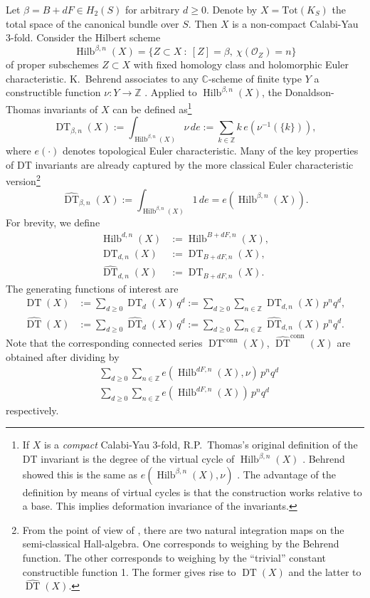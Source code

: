 \documentclass{amsart}
\theoremstyle{definition}
\newcommand{\CC} {\mathbb{C}}          %
\newcommand{\ZZ} {\mathbb{Z}}		%
\renewcommand{\O}{\mathcal{O}}
\newcommand{\Hilb}{\operatorname{Hilb}}
\newcommand{\DT}{\operatorname{DT}}
\newcommand{\conn}{\operatorname{conn}}
\begin{document}
Let $\beta = B+dF \in H_2(S)$ for arbitrary $d \geq 0$. Denote by $X = \mathrm{Tot}(K_S)$ the total space of the canonical bundle over $S$. Then $X$ is a non-compact Calabi-Yau 3-fold. Consider the Hilbert scheme
$$
\Hilb^{\beta,n}(X) = \{ Z \subset X \ : \ [Z] = \beta, \ \chi(\O_Z) = n\}
$$
of proper subschemes $Z \subset X$ with fixed homology class and holomorphic Euler characteristic. K.~Behrend associates to any $\CC$-scheme of finite type $Y$ a constructible function $\nu : Y \rightarrow \ZZ$ \cite{Beh}. Applied to $\Hilb^{\beta,n}(X)$, the Donaldson-Thomas invariants of $X$ can be defined as\footnote{If $X$ is a \emph{compact} Calabi-Yau 3-fold, R.P.~Thomas's original definition of the DT invariant is the degree of the virtual cycle of $\Hilb^{\beta,n}(X)$ \cite{Tho}. Behrend showed this is the same as $e(\Hilb^{\beta,n}(X),\nu)$ \cite{Beh}. The advantage of the definition by means of virtual cycles is that the construction works relative to a base. This implies deformation invariance of the invariants.} 
$$
\DT_{\beta,n}(X) := \int_{\Hilb^{\beta,n}(X)} \nu \, de := \sum_{k \in \ZZ} k \, e(\nu^{-1}(\{k\})),
$$
where $e(\cdot)$ denotes topological Euler characteristic. Many of the key properties of DT invariants are already captured by the more classical Euler characteristic version\footnote{From the point of view of \cite{JS, Bri}, there are two natural integration maps on the semi-classical Hall-algebra. One corresponds to weighing by the Behrend function. The other corresponds to weighing by the ``trivial'' constant constructible function 1. The former gives rise to $\DT(X)$ and the latter to $\widehat{\DT}(X)$.}
$$
\widehat{\DT}_{\beta,n}(X) := \int_{\Hilb^{\beta,n}(X)} 1 \, de = e(\Hilb^{\beta,n}(X)).
$$
For brevity, we define
\begin{align*}
\Hilb^{d,n}(X) &:=\Hilb^{B+dF,n}(X), \\
\DT_{d,n}(X) &:= \DT_{B+dF,n}(X), \\
\widehat{\DT}_{d,n}(X) &:= \DT_{B+dF,n}(X).
\end{align*}
The generating functions of interest are
\begin{align*}
\DT(X) &:= \sum_{d \geq 0} \DT_d(X) \, q^d := \sum_{d \geq 0} \sum_{n \in \ZZ} \DT_{d,n}(X) \, p^n q^d, \\
\widehat{\DT}(X) &:= \sum_{d \geq 0} \widehat{\DT}_d(X) \, q^d := \sum_{d \geq 0} \sum_{n \in \ZZ} \widehat{\DT}_{d,n}(X) \, p^n q^d.
\end{align*}
Note that the corresponding connected series $\DT^{\conn}(X)$, $\widehat{\DT}^{\conn}(X)$ are obtained after dividing by
\begin{align*}
&\sum_{d \geq 0} \sum_{n \in \ZZ} e(\Hilb^{dF,n}(X),\nu) \, p^n q^d \\
&\sum_{d \geq 0} \sum_{n \in \ZZ} e(\Hilb^{dF,n}(X)) \, p^n q^d
\end{align*}
respectively.
\end{document}
